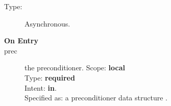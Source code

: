 

\begin{description}
\item[Type:] Asynchronous.
\item[\bf On Entry]
\item[prec] the preconditioner.
Scope: {\bf local} \\
Type: {\bf required}\\
Intent: {\bf in}.\\
Specified as: a preconditioner data structure \precdata.
\end{description}



